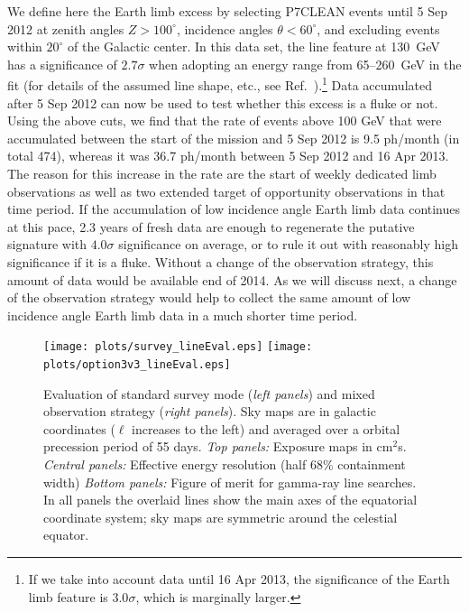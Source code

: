 \documentclass[aps,prd,superscriptaddress,nofootinbib,fixlfloat, 12pt]{revtex4-1}
\begin{document}
We define here the Earth limb excess by selecting P7CLEAN events until 5 Sep
2012 at zenith angles $Z>100^\circ$,
incidence angles $\theta<60^\circ$, and excluding events within $20^\circ$ of
the Galactic center. In this data set, the line feature at 130~GeV has a
significance of $2.7\sigma$ when
adopting an energy range from 65--260~GeV in the fit (for details of the
assumed line shape, etc.,
see Ref.~\cite{finkbeiner_systematics}).\footnote{If we take into account data
  until 16 Apr 2013, the
significance of the Earth limb feature is $3.0\sigma$, which is marginally
larger.}
Data accumulated after 5 Sep 2012 can
now be used to test whether this excess is a fluke or not. Using the above
cuts, we find that the rate of events above 100 GeV that were accumulated between the
start of the mission and 5 Sep 2012 is 9.5 ph/month (in total 474), whereas it
was 36.7 ph/month between 5 Sep 2012 and 16 Apr 2013. The reason for this increase
in the rate are the start of weekly dedicated limb observations as well as two extended
target of opportunity observations in that time period. If the accumulation of
low incidence angle Earth limb data continues at this pace, 2.3 years of fresh
data are enough to regenerate the putative signature with $4.0\sigma$
significance on average, or to rule it out with reasonably high significance if it is a
fluke. Without a change of the observation strategy, this amount of data would
be available end of 2014. As we will discuss next, a change of the
observation strategy would help to collect the same amount of low incidence
angle Earth limb data in a much shorter time period.



\begin{figure}[t]
  \begin{center}
    \texttt{[image: plots/survey\_lineEval.eps]}
    \texttt{[image: plots/option3v3\_lineEval.eps]}
    \vspace{-0.5cm}
  \end{center}
  \caption{Evaluation of standard survey mode (\emph{left panels}) and mixed observation
    strategy (\emph{right panels}). Sky maps are in galactic coordinates ($\ell$ increases
    to the left) and averaged over a orbital precession period of 55 days.
    \emph{Top
      panels:} Exposure maps in cm$^2$s.
    \emph{Central panels:}
    Effective energy resolution (half 68\% containment width)
  \emph{Bottom panels:} Figure of merit for gamma-ray line searches. In all
  panels the overlaid lines show the main axes of the equatorial coordinate
  system; sky maps are symmetric around the celestial equator.}
  \label{fig:mollweide}
\end{figure}
\end{document}
